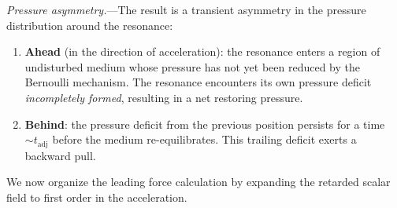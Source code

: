 \documentclass[aps,prd,onecolumn,superscriptaddress,nofootinbib,showpacs,12pt,notitlepage]{revtex4-2}
\begin{document}
\textit{Pressure asymmetry.}---The result is a
transient asymmetry in the pressure distribution
around the resonance:
\begin{enumerate}
  \item \textbf{Ahead} (in the direction of
    acceleration): the resonance enters a region of
    undisturbed medium whose pressure has not yet been
    reduced by the Bernoulli mechanism.  The resonance
    encounters its own pressure deficit
    \emph{incompletely formed}, resulting in a net
    restoring pressure.
  \item \textbf{Behind}: the pressure deficit from the
    previous position persists for a time
    $\sim t_{\mathrm{adj}}$ before the medium
    re-equilibrates.  This trailing deficit exerts a
    backward pull.
\end{enumerate}

We now organize the leading force calculation by
expanding the retarded scalar field to first order in
the acceleration.
\end{document}
